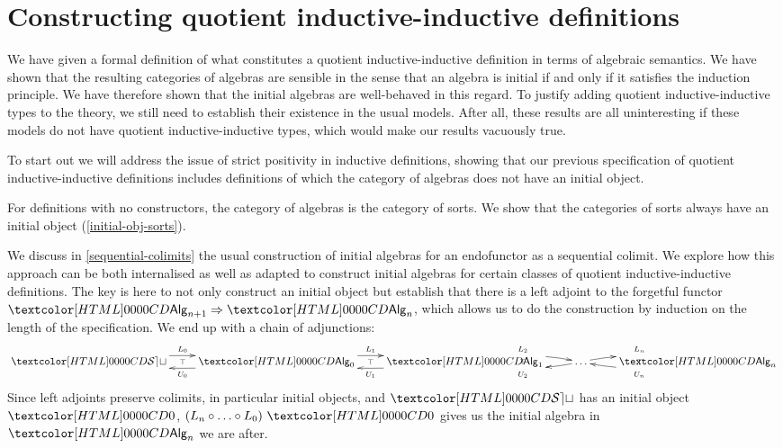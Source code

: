 \chapter{Constructing quotient inductive-inductive definitions}
\label{constructing}

We have given a formal definition of what constitutes a quotient
inductive-inductive definition in terms of algebraic semantics. We
have shown that the resulting categories of algebras are sensible in
the sense that an algebra is initial if and only if it satisfies the
induction principle. We have therefore shown that the initial algebras
are well-behaved in this regard. To justify adding quotient
inductive-inductive types to the theory, we still need to establish
their existence in the usual models. After all, these results are all
uninteresting if these models do not have quotient inductive-inductive
types, which would make our results vacuously true.

To start out we will address the issue of strict positivity in
inductive definitions, showing that our previous specification of
quotient inductive-inductive definitions includes definitions of which
the category of algebras does not have an initial object.

For definitions with no constructors, the category of algebras is the
category of sorts. We show that the categories of sorts always have an
initial object (\cref{initial-obj-sorts}).

We discuss in \cref{sequential-colimits} the usual construction of
initial algebras for an endofunctor as a sequential colimit. We
explore how this approach can be both internalised as well as adapted
to construct initial algebras for certain classes of quotient
inductive-inductive definitions. The key is here to not only construct
an initial object but establish that there is a left adjoint to the
forgetful functor $\Func{\Alg_{n+1}}{\Alg_{n}}$, which allows us to do
the construction by induction on the length of the specification. We
end up with a chain of adjunctions:
$$
\xymatrix{
\SET \ar@/^/[r]^{L_0}
\ar@{}[r]|{\top} 
&\Alg_0 \ar@/^/[l]^{U_0} \ar@/^/[r]^{L_1} 
\ar@{}[r]|{\top} 
&\Alg_1 \ar@/^/[l]^{U_1} \ar@/^/[r]^{L_2} 
\ar@{}[r]|{\top} 
&\hdots \ar@/^/[l]^{U_2} \ar@/^/[r]^{L_n} 
\ar@{}[r]|{\top} 
&\Alg_n \ar@/^/[l]^{U_n}
}
$$
Since left adjoints preserve colimits, in particular initial objects,
and $\SET$ has an initial object $\emptyty$,
$(L_n \circ \hdots \circ L_0)\ \emptyty$ gives us the initial algebra
in $\Alg_n$ we are after.

